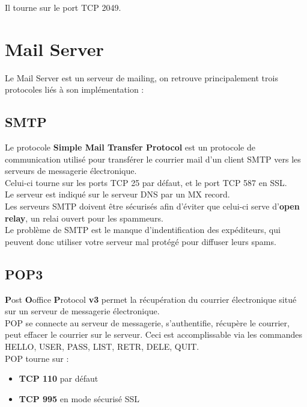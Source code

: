 \documentclass{report}
\begin{document}
			Il tourne sur le port TCP 2049.\\

	\section{Mail Server}

		Le Mail Server est un serveur de mailing, on retrouve principalement trois protocoles liés à son implémentation : \\

		\subsection{SMTP}

			Le protocole \textbf{Simple Mail Transfer Protocol} est un protocole de communication utilisé pour transférer le courrier mail d'un client SMTP vers les serveurs de messagerie électronique.\\

			Celui-ci tourne sur les ports TCP 25 par défaut, et le port TCP 587 en SSL.\\

			Le serveur est indiqué sur le serveur DNS par un MX record.\\

			Les serveurs SMTP doivent être sécurisés afin d'éviter que celui-ci serve d'\textbf{open relay}, un relai ouvert pour les spammeurs.\\
			Le problème de SMTP est le manque d'indentification des expéditeurs, qui peuvent donc utiliser votre serveur mal protégé pour diffuser leurs spams.\\

		\subsection{POP3}

			\textbf{P}ost \textbf{O}office \textbf{P}rotocol \textbf{v3} permet la récupération du courrier électronique situé sur un serveur de messagerie électronique.\\
			POP se connecte au serveur de messagerie, s'authentifie, récupère le courrier, peut effacer le courrier sur le serveur. Ceci est accomplissable via les commandes HELLO, USER, PASS, LIST, RETR, DELE, QUIT.\\

			POP tourne sur : \\
			\begin{itemize}
				\item \textbf{TCP 110} par défaut
				\item \textbf{TCP 995} en mode sécurisé SSL\\
			\end{itemize}
\end{document}
